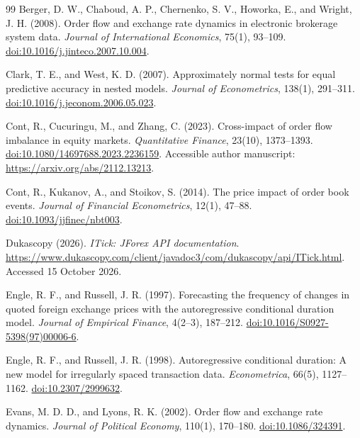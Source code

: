 \documentclass[12pt,letterpaper]{article}
\begin{document}
\clearpage
\begingroup
\singlespacing\raggedright
\setlength{\bibsep}{6pt}
\begin{thebibliography}{99}
Berger, D. W., Chaboud, A. P., Chernenko, S. V., Howorka, E., and Wright, J. H. (2008).
Order flow and exchange rate dynamics in electronic brokerage system data.
\emph{Journal of International Economics}, 75(1), 93--109.
\href{https://doi.org/10.1016/j.jinteco.2007.10.004}{doi:10.1016/j.jinteco.2007.10.004}.

Clark, T. E., and West, K. D. (2007).
Approximately normal tests for equal predictive accuracy in nested models.
\emph{Journal of Econometrics}, 138(1), 291--311.
\href{https://doi.org/10.1016/j.jeconom.2006.05.023}{doi:10.1016/j.jeconom.2006.05.023}.

Cont, R., Cucuringu, M., and Zhang, C. (2023).
Cross-impact of order flow imbalance in equity markets.
\emph{Quantitative Finance}, 23(10), 1373--1393.
\href{https://doi.org/10.1080/14697688.2023.2236159}{doi:10.1080/14697688.2023.2236159}.
Accessible author manuscript: \url{https://arxiv.org/abs/2112.13213}.

Cont, R., Kukanov, A., and Stoikov, S. (2014).
The price impact of order book events.
\emph{Journal of Financial Econometrics}, 12(1), 47--88.
\href{https://doi.org/10.1093/jjfinec/nbt003}{doi:10.1093/jjfinec/nbt003}.

Dukascopy (2026). \emph{ITick: JForex API documentation}.
\url{https://www.dukascopy.com/client/javadoc3/com/dukascopy/api/ITick.html}.
Accessed 15 October 2026.

Engle, R. F., and Russell, J. R. (1997).
Forecasting the frequency of changes in quoted foreign exchange prices with the autoregressive conditional duration model.
\emph{Journal of Empirical Finance}, 4(2--3), 187--212.
\href{https://doi.org/10.1016/S0927-5398(97)00006-6}{doi:10.1016/S0927-5398(97)00006-6}.

Engle, R. F., and Russell, J. R. (1998).
Autoregressive conditional duration: A new model for irregularly spaced transaction data.
\emph{Econometrica}, 66(5), 1127--1162.
\href{https://doi.org/10.2307/2999632}{doi:10.2307/2999632}.

Evans, M. D. D., and Lyons, R. K. (2002).
Order flow and exchange rate dynamics.
\emph{Journal of Political Economy}, 110(1), 170--180.
\href{https://doi.org/10.1086/324391}{doi:10.1086/324391}.


\end{thebibliography}
\end{document}
